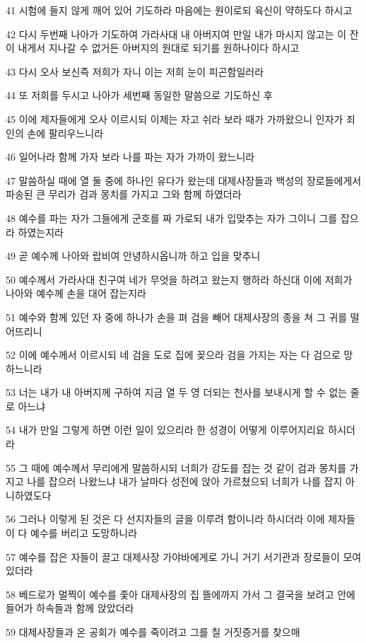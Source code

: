 \par 41 시험에 들지 않게 깨어 있어 기도하라 마음에는 원이로되 육신이 약하도다 하시고
\par 42 다시 두번째 나아가 기도하여 가라사대 내 아버지여 만일 내가 마시지 않고는 이 잔이 내게서 지나갈 수 없거든 아버지의 원대로 되기를 원하나이다 하시고
\par 43 다시 오사 보신즉 저희가 자니 이는 저희 눈이 피곤함일러라
\par 44 또 저희를 두시고 나아가 세번째 동일한 말씀으로 기도하신 후
\par 45 이에 제자들에게 오사 이르시되 이제는 자고 쉬라 보라 때가 가까왔으니 인자가 죄인의 손에 팔리우느니라
\par 46 일어나라 함께 가자 보라 나를 파는 자가 가까이 왔느니라
\par 47 말씀하실 때에 열 둘 중에 하나인 유다가 왔는데 대제사장들과 백성의 장로들에게서 파송된 큰 무리가 검과 몽치를 가지고 그와 함께 하였더라
\par 48 예수를 파는 자가 그들에게 군호를 짜 가로되 내가 입맞추는 자가 그이니 그를 잡으라 하였는지라
\par 49 곧 예수께 나아와 랍비여 안녕하시옵니까 하고 입을 맞추니
\par 50 예수께서 가라사대 친구여 네가 무엇을 하려고 왔는지 행하라 하신대 이에 저희가 나아와 예수께 손을 대어 잡는지라
\par 51 예수와 함께 있던 자 중에 하나가 손을 펴 검을 빼어 대제사장의 종을 쳐 그 귀를 떨어뜨리니
\par 52 이에 예수께서 이르시되 네 검을 도로 집에 꽂으라 검을 가지는 자는 다 검으로 망하느니라
\par 53 너는 내가 내 아버지께 구하여 지금 열 두 영 더되는 천사를 보내시게 할 수 없는 줄로 아느냐
\par 54 내가 만일 그렇게 하면 이런 일이 있으리라 한 성경이 어떻게 이루어지리요 하시더라
\par 55 그 때에 예수께서 무리에게 말씀하시되 너희가 강도를 잡는 것 같이 검과 몽치를 가지고 나를 잡으러 나왔느냐 내가 날마다 성전에 앉아 가르쳤으되 너희가 나를 잡지 아니하였도다
\par 56 그러나 이렇게 된 것은 다 선지자들의 글을 이루려 함이니라 하시더라 이에 제자들이 다 예수를 버리고 도망하니라
\par 57 예수를 잡은 자들이 끌고 대제사장 가야바에게로 가니 거기 서기관과 장로들이 모여 있더라
\par 58 베드로가 멀찍이 예수를 좇아 대제사장의 집 뜰에까지 가서 그 결국을 보려고 안에 들어가 하속들과 함께 앉았더라
\par 59 대제사장들과 온 공회가 예수를 죽이려고 그를 칠 거짓증거를 찾으매
